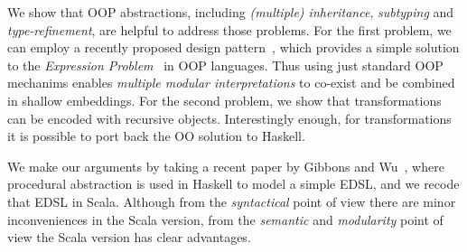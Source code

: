 We show that OOP abstractions, including \emph{(multiple)
  inheritance}, \emph{subtyping} and \emph{type-refinement}, are
helpful to address those problems. For the first problem, we can
employ a recently proposed design pattern~\cite{eptrivially16}, which provides a simple
solution to the \emph{Expression Problem}~\cite{expPb} in OOP languages. Thus
using just standard OOP mechanims enables \emph{multiple modular
  interpretations} to co-exist and be combined in shallow embeddings.
For the second problem, we show that transformations can be encoded 
with recursive objects. Interestingly enough, for transformations it
is possible to port back the OO solution to
Haskell.

We make our arguments by taking a recent paper by Gibbons and Wu~\cite{gibbons2014folding},
where procedural abstraction is used in Haskell to model a simple
EDSL, and we recode that EDSL in Scala. Although from the
\emph{syntactical} point of view there are minor inconveniences in
the Scala version, from the \emph{semantic} and \emph{modularity} point of view the
Scala version has clear advantages.

\begin{comment}
In summary, our contributions are:

\begin{itemize}

\item {}

\item {\bf Multiple Modular Interpretations for Shallow Embeddings:} 
  We show that with standard OOP mechanisms it is easy to support multiple modular
  interpretations for shallow embeddings.

\item {\bf Transformations for Shallow Embeddings:} We show that
  transformations are encodable with recursive objects. Moreover, this technique
  can be ported back into functional programming as well.

\end{itemize}
\end{comment}